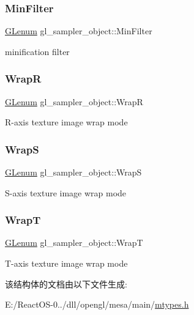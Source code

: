 \subsubsection{\texorpdfstring{Min\+Filter}{MinFilter}}
{\footnotesize\ttfamily \hyperlink{interfacevoid}{G\+Lenum} gl\+\_\+sampler\+\_\+object\+::\+Min\+Filter}

minification filter \mbox{\label{structgl__sampler__object_ac31491fd29fabc1a54e423a42d9e1580}} 
\subsubsection{\texorpdfstring{WrapR}{WrapR}}
{\footnotesize\ttfamily \hyperlink{interfacevoid}{G\+Lenum} gl\+\_\+sampler\+\_\+object\+::\+WrapR}

R-\/axis texture image wrap mode \mbox{\label{structgl__sampler__object_a98710e17dd1a1903537469054ecb556e}} 
\subsubsection{\texorpdfstring{WrapS}{WrapS}}
{\footnotesize\ttfamily \hyperlink{interfacevoid}{G\+Lenum} gl\+\_\+sampler\+\_\+object\+::\+WrapS}

S-\/axis texture image wrap mode \mbox{\label{structgl__sampler__object_a96c3ba2023e6d85d7fce3953b8a9b4e8}} 
\subsubsection{\texorpdfstring{WrapT}{WrapT}}
{\footnotesize\ttfamily \hyperlink{interfacevoid}{G\+Lenum} gl\+\_\+sampler\+\_\+object\+::\+WrapT}

T-\/axis texture image wrap mode 

该结构体的文档由以下文件生成\+:\begin{DoxyCompactItemize}
\item 
E\+:/\+React\+O\+S-\/0../dll/opengl/mesa/main/\hyperlink{mtypes_8h}{mtypes.\+h}\end{DoxyCompactItemize}
